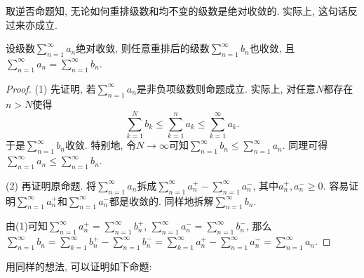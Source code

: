 取逆否命题知, 无论如何重排级数和均不变的级数是绝对收敛的. 实际上, 这句话反过来亦成立. 

\begin{proposition}{}
	设级数$\sum_{n=1}^{\infty} a_n$绝对收敛, 则任意重排后的级数$\sum_{n=1}^{\infty} b_n$也收敛, 且$\sum_{n=1}^{\infty} a_n = \sum_{n=1}^{\infty} b_n$. 
\end{proposition}
\begin{proof}
	(1) 先证明, 若$\sum_{n=1}^{\infty} a_n$是非负项级数则命题成立. 实际上, 对任意$N$都存在$n>N$使得$$\sum_{k=1}^{N}b_k \leq \sum_{k=1}^{n}a_k \leq \sum_{k=1}^{\infty} a_k.$$
	于是$\sum_{n=1}^{\infty} b_n$收敛. 特别地, 令$N\to \infty$可知$\sum_{n=1}^{\infty} b_n \leq \sum_{n=1}^{\infty} a_n$. 同理可得$\sum_{n=1}^{\infty} a_n \leq \sum_{n=1}^{\infty} b_n$. 
	
	(2) 再证明原命题. 将$\sum_{n=1}^{\infty} a_n$拆成$\sum_{n=1}^{\infty} a_n^+ - \sum_{n=1}^{\infty} a_n^-$, 其中$a_n^+,a_n^- \geq 0$. 容易证明$\sum_{n=1}^{\infty} a_n^+$和$\sum_{n=1}^{\infty} a_n^-$都是收敛的. 同样地拆解$\sum_{n=1}^{\infty} b_n$. 
	
	由(1)可知$\sum_{n=1}^{\infty} a_n^+ = \sum_{n=1}^{\infty} b_n^+$, $\sum_{n=1}^{\infty} a_n^- = \sum_{n=1}^{\infty} b_n^-$, 那么$\sum_{n=1}^{\infty} b_n = \sum_{k=1}^{\infty} b_n^+ - \sum_{n=1}^{\infty} b_n^- = \sum_{k=1}^{\infty} a_n^+ - \sum_{n=1}^{\infty} a_n^- = \sum_{n=1}^{\infty} a_n$. 
\end{proof}

用同样的想法, 可以证明如下命题: 

